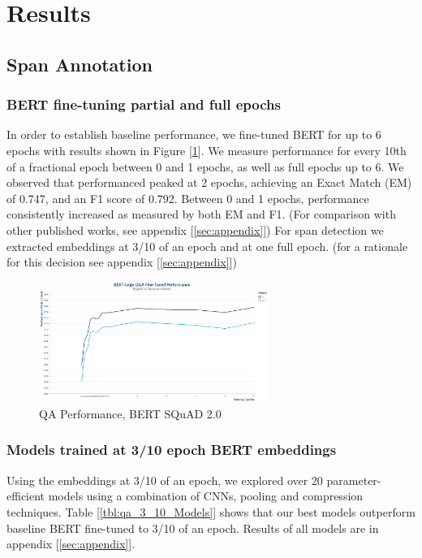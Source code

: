 \section{Results}

\subsection{Span Annotation}
\subsubsection{BERT fine-tuning partial and full epochs}
In order to establish baseline performance, we fine-tuned BERT for up to 6 epochs with results shown in Figure [\ref{fig:QnABertPerformance}]. We measure performance for every 10th of a fractional epoch between 0 and 1 epochs, as well as full epochs up to 6. We observed that performanced peaked at 2 epochs, achieving an Exact Match (EM) of 0.747, and an F1 score of 0.792. Between 0 and 1 epochs, performance consistently increased as measured by  both EM and F1. (For comparison with other published works, see appendix [\ref{sec:appendix}]) For span detection we extracted embeddings at 3/10 of an epoch and at one full epoch. (for a rationale for this decision see appendix [\ref{sec:appendix}])
\begin{figure}[ht]
	\centering
	\includegraphics[width=7.5cm]{images/QnA_BERT_Training_Performance_plot.png}
	\caption{\label{fig:QnABertPerformance}QA Performance, BERT SQuAD 2.0}
\end{figure}

\subsubsection{Models trained at 3/10 epoch BERT embeddings}
Using the embeddings at 3/10 of an epoch, we explored over 20 parameter-efficient models using a combination of CNNs, pooling and compression techniques.  Table [\ref{tbl:qa_3_10_Models}] shows that our best models outperform baseline BERT fine-tuned to 3/10 of an epoch. Results of all models are in appendix [\ref{sec:appendix}]. \\

